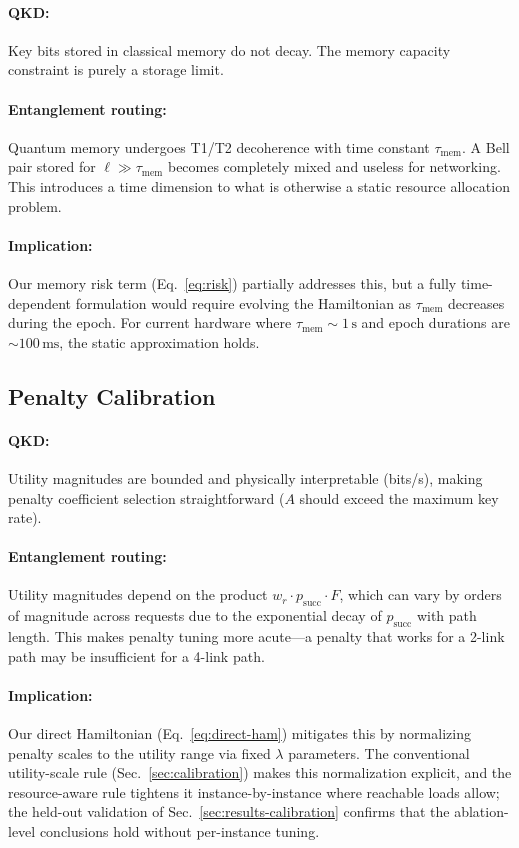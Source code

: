 \documentclass[10pt,a4paper]{article}
\begin{document}
\paragraph{QKD:}
Key bits stored in classical memory do not decay.  The memory
capacity constraint is purely a storage limit.

\paragraph{Entanglement routing:}
Quantum memory undergoes T1/T2 decoherence with time constant
$\tau_{\text{mem}}$.  A Bell pair stored for $\ell \gg \tau_{\text{mem}}$
becomes completely mixed and useless for networking.  This introduces
a time dimension to what is otherwise a static resource allocation
problem.

\paragraph{Implication:}
Our memory risk term (Eq.~\eqref{eq:risk}) partially addresses
this, but a fully time-dependent formulation would require
evolving the Hamiltonian as $\tau_{\text{mem}}$ decreases during
the epoch.  For current hardware where $\tau_{\text{mem}} \sim
1\,\text{s}$ and epoch durations are $\sim 100\,\text{ms}$, the
static approximation holds.

\subsection{Penalty Calibration}

\paragraph{QKD:}
Utility magnitudes are bounded and physically interpretable
(bits/s), making penalty coefficient selection straightforward
($A$ should exceed the maximum key rate).

\paragraph{Entanglement routing:}
Utility magnitudes depend on the product $w_r \cdot p_{\text{succ}}
\cdot F$, which can vary by orders of magnitude across requests
due to the exponential decay of $p_{\text{succ}}$ with path length.
This makes penalty tuning more acute---a penalty that works for
a 2-link path may be insufficient for a 4-link path.

\paragraph{Implication:}
Our direct Hamiltonian (Eq.~\eqref{eq:direct-ham}) mitigates this
by normalizing penalty scales to the utility range via fixed
$\lambda$ parameters.  The conventional utility-scale rule
(Sec.~\ref{sec:calibration}) makes this normalization explicit, and
the resource-aware rule tightens it instance-by-instance where
reachable loads allow; the held-out validation of Sec.~\ref{sec:results-calibration}
confirms that the ablation-level conclusions hold without
per-instance tuning.
\end{document}
